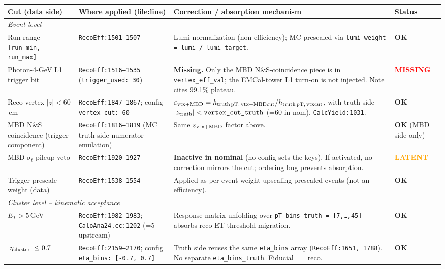 \documentclass[11pt,a4paper]{article}
\newcommand{\crit}[1]{\textcolor{red}{\textbf{#1}}}
\newcommand{\warn}[1]{\textcolor{orange}{\textbf{#1}}}
\newcommand{\ok}[1]{\textcolor{green!50!black}{\textbf{#1}}}
\begin{document}
\begin{longtable}{@{}p{4.0cm}p{4.2cm}p{5.5cm}p{3.2cm}@{}}
\toprule
Cut (data side) & Where applied (file:line) & Correction / absorption mechanism & Status \\
\midrule
\endhead
\multicolumn{4}{l}{\textit{Event level}} \\
\midrule
Run range \texttt{[run\_min, run\_max]} &
\texttt{RecoEff:1501--1507} &
Lumi normalization (non-efficiency); MC prescaled via
\texttt{lumi\_weight = lumi / lumi\_target}. &
\ok{OK} \\
\addlinespace
Photon-4-GeV L1 trigger bit &
\texttt{RecoEff:1516--1535} (\texttt{trigger\_used: 30}) &
\textbf{Missing.} Only the MBD N$\&$S-coincidence piece is in
\texttt{vertex\_eff\_val}; the EMCal-tower L1 turn-on is not injected.
Note cites 99.1\% plateau. &
\crit{MISSING} \\
\addlinespace
Reco vertex $|z|<60$\,cm &
\texttt{RecoEff:1847--1867}; config \texttt{vertex\_cut: 60} &
$\varepsilon_{\rm vtx+MBD}
= h_{\rm truth\,pT,\,vtx+MBDcut} / h_{\rm truth\,pT,\,vtxcut}$,
with truth-side $|z_{\rm truth}|<\texttt{vertex\_cut\_truth}$ (=60
in nom). \texttt{CalcYield:1031}. &
\ok{OK} \\
\addlinespace
MBD N$\&$S coincidence (trigger component) &
\texttt{RecoEff:1816--1819} (MC truth-side numerator emulation) &
Same $\varepsilon_{\rm vtx+MBD}$ factor above. &
\ok{OK} (MBD side only) \\
\addlinespace
MBD $\sigma_t$ pileup veto &
\texttt{RecoEff:1920--1927} &
\textbf{Inactive in nominal} (no config sets the keys). If activated,
no correction mirrors the cut; ordering bug prevents absorption. &
\warn{LATENT} \\
\addlinespace
Trigger prescale weight (data) &
\texttt{RecoEff:1538--1554} &
Applied as per-event weight upscaling prescaled events (not an
efficiency). &
\ok{OK} \\
\midrule
\multicolumn{4}{l}{\textit{Cluster level -- kinematic acceptance}} \\
\midrule
$E_T > 5$\,GeV &
\texttt{RecoEff:1982--1983}; \texttt{CaloAna24.cc:1202} (=5 upstream) &
Response-matrix unfolding over \texttt{pT\_bins\_truth = [7,\ldots,45]}
absorbs reco-ET-threshold migration. &
\ok{OK} \\
\addlinespace
$|\eta_{\rm cluster}| \le 0.7$ &
\texttt{RecoEff:2159--2170}; config \texttt{eta\_bins: [-0.7, 0.7]} &
Truth side reuses the same \texttt{eta\_bins} array
(\texttt{RecoEff:1651, 1788}). No separate \texttt{eta\_bins\_truth}.
Fiducial $=$ reco. &
\ok{OK} \\

\end{longtable}
\end{document}
